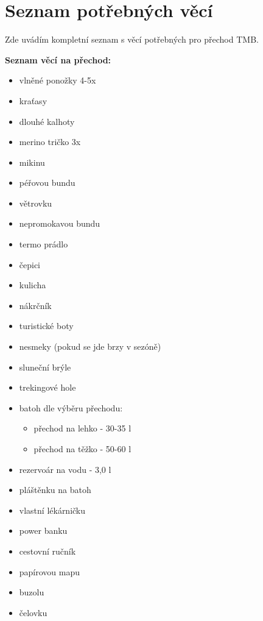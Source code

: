\chapter{Seznam potřebných věcí}
\label{Potrebny_material}
\def\figurename{Obr.} %
\def\tablename{Tab.} %
\def\figureautorefname{obr.} %
\def\tableautorefname{tab.} %
\def\chapterautorefname{kapitola} %

Zde uvádím kompletní seznam s věcí potřebných pro přechod TMB.

\noindent\textbf{Seznam věcí na přechod:}
\begin{itemize}
    \item vlněné ponožky 4-5x
    \item kraťasy
    \item dlouhé kalhoty
    \item merino tričko 3x
    \item mikinu
    \item péřovou bundu
    \item větrovku
    \item nepromokavou bundu
    \item termo prádlo
    \item čepici
    \item kulicha
    \item nákrčník
    \item turistické boty
    \item nesmeky (pokud se jde brzy v sezóně)
    \item sluneční brýle
    \item trekingové hole
    \item batoh dle výběru přechodu:
    \begin{itemize}
    	\item přechod na lehko - 30-35 l
    	\item přechod na těžko - 50-60 l
    \end{itemize}
    \item rezervoár na vodu - 3,0 l
    \item pláštěnku na batoh
    \item vlastní lékárničku
    \item power banku
    \item cestovní ručník
    \item papírovou mapu
    \item buzolu
    \item čelovku
\end{itemize}

